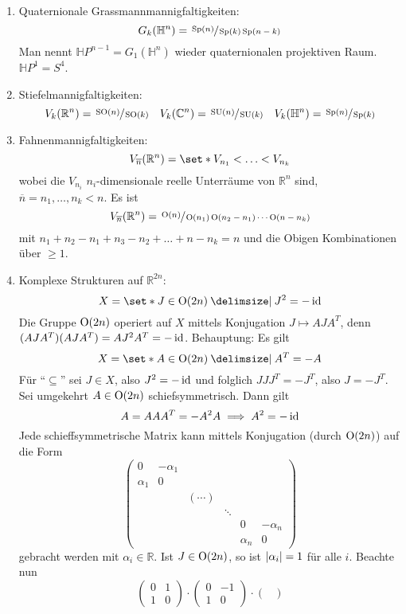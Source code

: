 \begin{beispiel*}[{name=[homogene Räume]}]
\begin{enumerate}[1)]
		\item Quaternionale Grassmannmannigfaltigkeiten:
		\[
			G_k(\mathbb{H}^n) = \sfrac{\Sp(n)}{\Sp(k) \Sp(n-k)}
		\]
		Man nennt $\mathbb{H}P^{n-1} = G_1(\mathbb{H}^n)$ wieder quaternionalen projektiven Raum. $\mathbb{H}P^1 = S^4$.
		\item Stiefelmannigfaltigkeiten:
		\[
			V_k(\mathbb{R}^n) = \sfrac{\SO(n)}{\SO(k)} \quad V_k(\mathbb{C}^n) = \sfrac{\SU(n)}{\SU(k)} \quad V_k(\mathbb{H}^n) = \sfrac{\Sp(n)}{\Sp(k)}
		\]
		\item Fahnenmannigfaltigkeiten:
		\[
			V_{\overline{n}}(\mathbb{R}^n) = \set*{V_{n_1} < \ldots < V_{n_k}}
		\]
		wobei die $V_{n_i}$ $n_i$-dimensionale reelle Unterräume von $\mathbb{R}^n$ sind, $\overline{n} = n_1, \ldots ,n_k <n$.
		Es ist
		\[
			V_{\overline{n}}(\mathbb{R}^n) = \sfrac{\On(n)}{\On(n_1) \On(n_2 - n_1) \cdots \On(n-n_k)}
		\]
		mit $n_1 + n_2 - n_1 + n_3 - n_2 + \ldots + n - n_k =n$ und die Obigen Kombinationen über $\ge 1$.
		\item Komplexe Strukturen auf $\mathbb{R}^{2n}$:
		\[
			X = \set*{J \in  \On(2n) \given J^2 = - \id}
		\]
		Die Gruppe $\On(2n)$ operiert auf $X$ mittels Konjugation $J \mapsto A J A^T$, denn $(AJA^T)(AJA^T) = A J^2 A^T = - \id$.
		Behauptung: Es gilt 
		\[
			X = \set*{A \in \On(2n) \given A^T = -A}
		\]
		Für \enquote{$\subseteq$} sei $J \in X$, also $J^2 = - \id$ und folglich $J J J^T = - J^T$, also $J= -J^T$.
		Sei umgekehrt $A \in \On(2n)$ schiefsymmetrisch.
		Dann gilt
		\[
			A = A A A^T = - A^2 A\implies A^2 = - \id
		\]
		Jede schieffsymmetrische Matrix kann mittels Konjugation (durch $\On(2n)$) auf die Form 
		\[
			\begin{pmatrix}
				0 & - \alpha_1 & & & & \\
				\alpha_1 & 0 & & & & \\
				& & (\cdots) & & &  \\
				& & & \ddots & & \\
				& & & & 0 & -\alpha_n \\
				& & & & \alpha_n & 0
			\end{pmatrix}
		\]
		gebracht werden mit $\alpha_i \in \mathbb{R}$.
		Ist $J \in \On(2n)$, so ist $\abs*{\alpha_i}=1 $ für alle $i$.
		Beachte nun
		\[
			\begin{pmatrix}
				0 & 1 \\ 1 & 0
			\end{pmatrix} \cdot \begin{pmatrix}
				0 & -1 \\ 1 & 0
			\end{pmatrix} \cdot \begin{pmatrix}

\end{pmatrix}\]
\end{enumerate}
\end{beispiel*}
